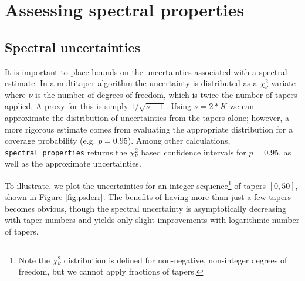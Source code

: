 \documentclass[10pt]{article}\usepackage[]{graphicx}\usepackage[]{color}
\newcommand{\Rcmd}[1]{\texttt{#1}}
\begin{document}
\section{Assessing spectral properties}
\subsection{Spectral uncertainties}
It is important to place bounds on the uncertainties associated
with a spectral estimate.
In a multitaper algorithm the uncertainty is distributed as
a $\chi{}_{\nu}^2$ variate where $\nu$ is
the number of degrees of freedom, which is twice the
number of tapers applied.
A proxy for this is simply $1/\sqrt{\nu - 1}$.
Using $\nu = 2*K$ we can approximate the distribution
of uncertainties from the tapers alone; however, a more
rigorous estimate comes from evaluating the appropriate 
distribution  for a coverage probability (e.g. $p=0.95$).
Among other calculations, \Rcmd{spectral\_properties} returns the 
$\chi{}_{\nu}^2$ based confidence intervals for $p=0.95$, as well as the
approximate uncertainties.  

To illustrate, we 
plot the uncertainties for an integer sequence\footnote{
Note the $\chi{}_{\nu}^2$ distribution is defined for non-negative,
non-integer degrees of freedom, but we cannot apply
fractions of tapers.} of tapers $[0, 50]$, shown in
Figure \ref{fig:psderr}.  The benefits of having more than just
a few tapers becomes obvious, though the spectral uncertainty
is asymptotically decreasing with taper numbers and yields
only slight improvements with logarithmic number of tapers.
\end{document}
